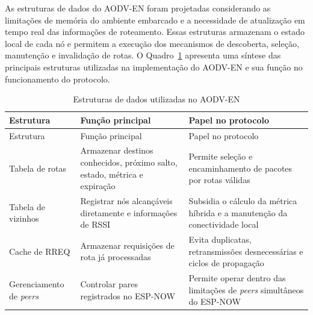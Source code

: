 As estruturas de dados do AODV-EN foram projetadas considerando as
limitações de memória do ambiente embarcado e a necessidade de
atualização em tempo real das informações de roteamento. Essas
estruturas armazenam o estado local de cada nó e permitem a execução dos
mecanismos de descoberta, seleção, manutenção e invalidação de rotas. O
Quadro~\ref{quadro:estruturas} apresenta uma síntese das principais estruturas utilizadas na
implementação do AODV-EN e sua função no funcionamento do protocolo.
{\def\LTcaptype{quadro}
\begin{longtable}[]{@{}
  >{\raggedright\arraybackslash}p{}
  >{\raggedright\arraybackslash}p{}
  >{\raggedright\arraybackslash}p{}@{}}
\caption{Estruturas de dados utilizadas no AODV-EN}\label{quadro:estruturas}\\
\toprule\noalign{}
\begin{minipage}[b]{\linewidth}\raggedright
Estrutura
\end{minipage} & \begin{minipage}[b]{\linewidth}\raggedright
Função principal
\end{minipage} & \begin{minipage}[b]{\linewidth}\raggedright
Papel no protocolo
\end{minipage} \\
\midrule\noalign{}
\endfirsthead
\toprule\noalign{}
\begin{minipage}[b]{\linewidth}\raggedright
Estrutura
\end{minipage} & \begin{minipage}[b]{\linewidth}\raggedright
Função principal
\end{minipage} & \begin{minipage}[b]{\linewidth}\raggedright
Papel no protocolo
\end{minipage} \\
\midrule\noalign{}
\endhead
\bottomrule\noalign{}
\endlastfoot
Tabela de rotas & Armazenar destinos conhecidos, próximo salto, estado,
métrica e expiração & Permite seleção e encaminhamento de pacotes por
rotas válidas \\
Tabela de vizinhos & Registrar nós alcançáveis diretamente e informações
de RSSI & Subsidia o cálculo da métrica híbrida e a manutenção da
conectividade local \\
Cache de RREQ & Armazenar requisições de rota já processadas & Evita
duplicatas, retransmissões desnecessárias e ciclos de propagação \\
Gerenciamento de \emph{peers} & Controlar pares registrados no ESP-NOW &
Permite operar dentro das limitações de \emph{peers} simultâneos do ESP-NOW \\
\end{longtable}
}

